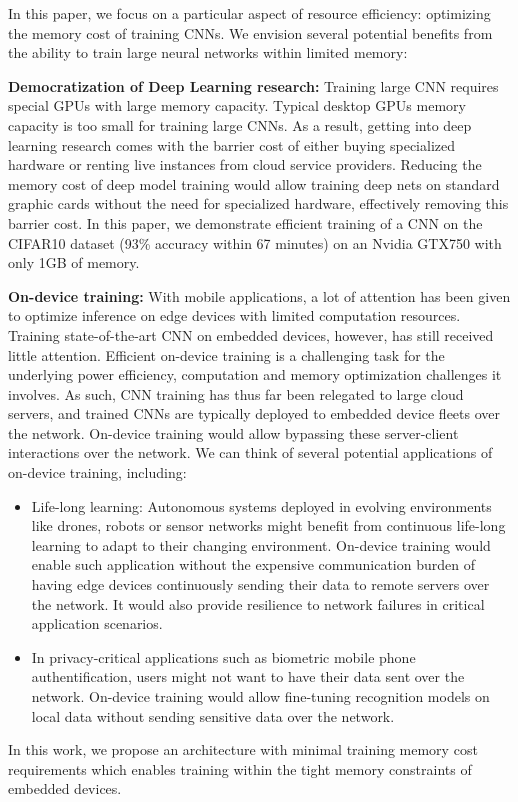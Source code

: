 \documentclass[twocolumn]{bmcart}
\begin{document}
In this paper, we focus on a particular aspect of resource efficiency: optimizing the memory cost of training CNNs. 
We envision several potential benefits from the ability to train large neural networks within limited memory:

\textbf{Democratization of Deep Learning research:} 
Training large CNN requires special GPUs with large memory capacity. 
Typical desktop GPUs memory capacity is too small for training large CNNs.
As a result, getting into deep learning research comes with the barrier cost of either buying specialized hardware or renting live instances from cloud service providers. 
Reducing the memory cost of deep model training would allow training deep nets on standard graphic cards without the need for specialized hardware, effectively removing this barrier cost.
In this paper, we demonstrate efficient training of a CNN on the CIFAR10 dataset (93\% accuracy within 67 minutes) on an Nvidia GTX750 with only 1GB of memory.

\textbf{On-device training:}
With mobile applications, a lot of attention has been given to optimize inference on edge devices with limited computation resources.
Training state-of-the-art CNN on embedded devices, however, has still received little attention.
Efficient on-device training is a challenging task for the underlying power efficiency, computation and memory optimization challenges it involves.
As such, CNN training has thus far been relegated to large cloud servers, and trained CNNs are typically deployed to embedded device fleets over the network.
On-device training would allow bypassing these server-client interactions over the network.
We can think of several potential applications of on-device training, including:
\begin{itemize}
 \item Life-long learning: Autonomous systems deployed in evolving environments like drones, robots or sensor networks might benefit from continuous life-long learning to adapt to their changing environment.
On-device training would enable such application without the expensive communication burden of having edge devices continuously sending their data to remote servers over the network. It would also provide resilience to network failures in critical application scenarios.
 \item In privacy-critical applications such as biometric mobile phone authentification, users might not want to have their data sent over the network. 
On-device training would allow fine-tuning recognition models on local data without sending sensitive data over the network.
\end{itemize}
In this work, we propose an architecture with minimal training memory cost requirements which enables training within the tight memory constraints of embedded devices. 
\end{document}
